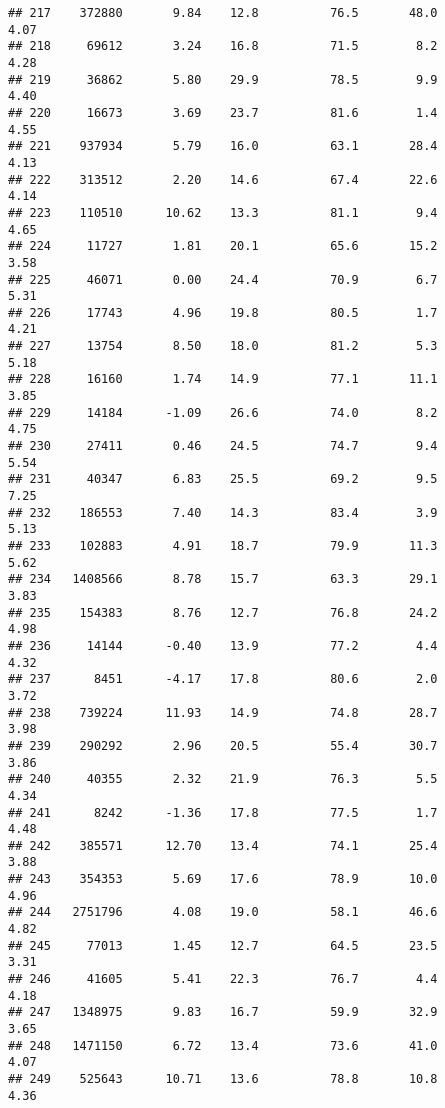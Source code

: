 \documentclass[
]{article}
\begin{document}
\begin{verbatim}
## 217    372880       9.84    12.8          76.5       48.0              4.07
## 218     69612       3.24    16.8          71.5        8.2              4.28
## 219     36862       5.80    29.9          78.5        9.9              4.40
## 220     16673       3.69    23.7          81.6        1.4              4.55
## 221    937934       5.79    16.0          63.1       28.4              4.13
## 222    313512       2.20    14.6          67.4       22.6              4.14
## 223    110510      10.62    13.3          81.1        9.4              4.65
## 224     11727       1.81    20.1          65.6       15.2              3.58
## 225     46071       0.00    24.4          70.9        6.7              5.31
## 226     17743       4.96    19.8          80.5        1.7              4.21
## 227     13754       8.50    18.0          81.2        5.3              5.18
## 228     16160       1.74    14.9          77.1       11.1              3.85
## 229     14184      -1.09    26.6          74.0        8.2              4.75
## 230     27411       0.46    24.5          74.7        9.4              5.54
## 231     40347       6.83    25.5          69.2        9.5              7.25
## 232    186553       7.40    14.3          83.4        3.9              5.13
## 233    102883       4.91    18.7          79.9       11.3              5.62
## 234   1408566       8.78    15.7          63.3       29.1              3.83
## 235    154383       8.76    12.7          76.8       24.2              4.98
## 236     14144      -0.40    13.9          77.2        4.4              4.32
## 237      8451      -4.17    17.8          80.6        2.0              3.72
## 238    739224      11.93    14.9          74.8       28.7              3.98
## 239    290292       2.96    20.5          55.4       30.7              3.86
## 240     40355       2.32    21.9          76.3        5.5              4.34
## 241      8242      -1.36    17.8          77.5        1.7              4.48
## 242    385571      12.70    13.4          74.1       25.4              3.88
## 243    354353       5.69    17.6          78.9       10.0              4.96
## 244   2751796       4.08    19.0          58.1       46.6              4.82
## 245     77013       1.45    12.7          64.5       23.5              3.31
## 246     41605       5.41    22.3          76.7        4.4              4.18
## 247   1348975       9.83    16.7          59.9       32.9              3.65
## 248   1471150       6.72    13.4          73.6       41.0              4.07
## 249    525643      10.71    13.6          78.8       10.8              4.36

\end{verbatim}
\end{document}
